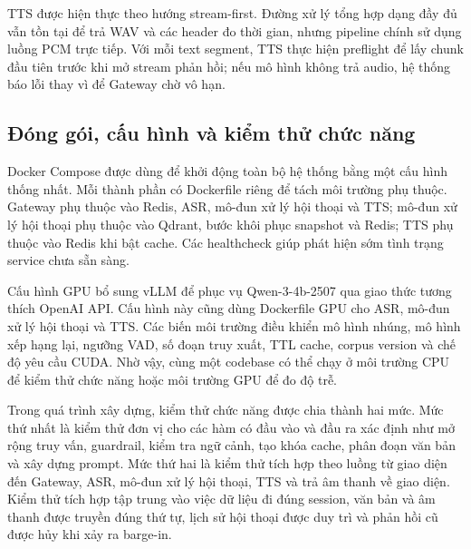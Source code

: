 \documentclass[a4paper,13pt,twoside]{report}
\begin{document}
TTS được hiện thực theo hướng stream-first. Đường xử lý tổng hợp dạng đầy đủ vẫn tồn tại để trả WAV và các header đo thời gian, nhưng pipeline chính sử dụng luồng PCM trực tiếp. Với mỗi text segment, TTS thực hiện preflight để lấy chunk đầu tiên trước khi mở stream phản hồi; nếu mô hình không trả audio, hệ thống báo lỗi thay vì để Gateway chờ vô hạn.

\subsection{Đóng gói, cấu hình và kiểm thử chức năng}

Docker Compose được dùng để khởi động toàn bộ hệ thống bằng một cấu hình thống nhất. Mỗi thành phần có Dockerfile riêng để tách môi trường phụ thuộc. Gateway phụ thuộc vào Redis, ASR, mô-đun xử lý hội thoại và TTS; mô-đun xử lý hội thoại phụ thuộc vào Qdrant, bước khôi phục snapshot và Redis; TTS phụ thuộc vào Redis khi bật cache. Các healthcheck giúp phát hiện sớm tình trạng service chưa sẵn sàng.

Cấu hình GPU bổ sung vLLM để phục vụ Qwen-3-4b-2507 qua giao thức tương thích OpenAI API. Cấu hình này cũng dùng Dockerfile GPU cho ASR, mô-đun xử lý hội thoại và TTS. Các biến môi trường điều khiển mô hình nhúng, mô hình xếp hạng lại, ngưỡng VAD, số đoạn truy xuất, TTL cache, corpus version và chế độ yêu cầu CUDA. Nhờ vậy, cùng một codebase có thể chạy ở môi trường CPU để kiểm thử chức năng hoặc môi trường GPU để đo độ trễ.

Trong quá trình xây dựng, kiểm thử chức năng được chia thành hai mức. Mức thứ nhất là kiểm thử đơn vị cho các hàm có đầu vào và đầu ra xác định như mở rộng truy vấn, guardrail, kiểm tra ngữ cảnh, tạo khóa cache, phân đoạn văn bản và xây dựng prompt. Mức thứ hai là kiểm thử tích hợp theo luồng từ giao diện đến Gateway, ASR, mô-đun xử lý hội thoại, TTS và trả âm thanh về giao diện. Kiểm thử tích hợp tập trung vào việc dữ liệu đi đúng session, văn bản và âm thanh được truyền đúng thứ tự, lịch sử hội thoại được duy trì và phản hồi cũ được hủy khi xảy ra barge-in.
\end{document}
